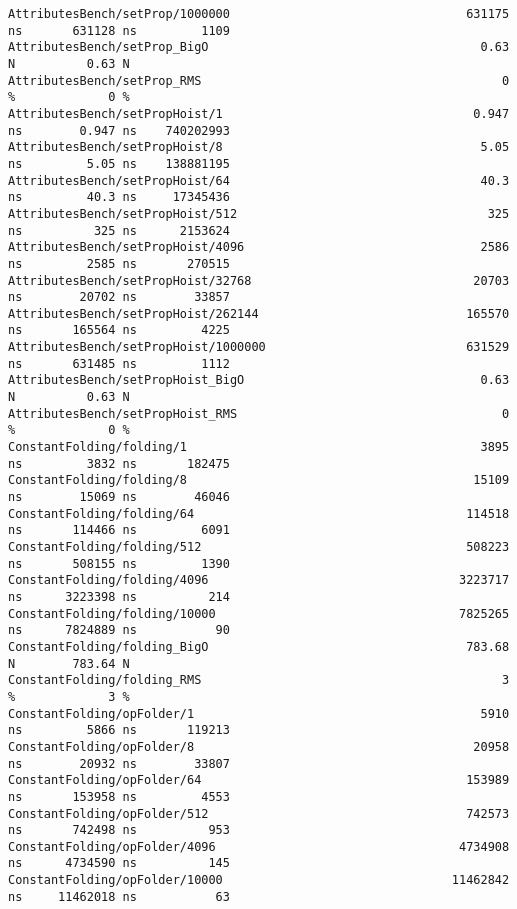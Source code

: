 \begin{code}
\begin{verbatim}
AttributesBench/setProp/1000000                                 631175 ns       631128 ns         1109
AttributesBench/setProp_BigO                                      0.63 N          0.63 N
AttributesBench/setProp_RMS                                          0 %             0 %
AttributesBench/setPropHoist/1                                   0.947 ns        0.947 ns    740202993
AttributesBench/setPropHoist/8                                    5.05 ns         5.05 ns    138881195
AttributesBench/setPropHoist/64                                   40.3 ns         40.3 ns     17345436
AttributesBench/setPropHoist/512                                   325 ns          325 ns      2153624
AttributesBench/setPropHoist/4096                                 2586 ns         2585 ns       270515
AttributesBench/setPropHoist/32768                               20703 ns        20702 ns        33857
AttributesBench/setPropHoist/262144                             165570 ns       165564 ns         4225
AttributesBench/setPropHoist/1000000                            631529 ns       631485 ns         1112
AttributesBench/setPropHoist_BigO                                 0.63 N          0.63 N
AttributesBench/setPropHoist_RMS                                     0 %             0 %
ConstantFolding/folding/1                                         3895 ns         3832 ns       182475
ConstantFolding/folding/8                                        15109 ns        15069 ns        46046
ConstantFolding/folding/64                                      114518 ns       114466 ns         6091
ConstantFolding/folding/512                                     508223 ns       508155 ns         1390
ConstantFolding/folding/4096                                   3223717 ns      3223398 ns          214
ConstantFolding/folding/10000                                  7825265 ns      7824889 ns           90
ConstantFolding/folding_BigO                                    783.68 N        783.64 N
ConstantFolding/folding_RMS                                          3 %             3 %
ConstantFolding/opFolder/1                                        5910 ns         5866 ns       119213
ConstantFolding/opFolder/8                                       20958 ns        20932 ns        33807
ConstantFolding/opFolder/64                                     153989 ns       153958 ns         4553
ConstantFolding/opFolder/512                                    742573 ns       742498 ns          953
ConstantFolding/opFolder/4096                                  4734908 ns      4734590 ns          145
ConstantFolding/opFolder/10000                                11462842 ns     11462018 ns           63

\end{verbatim}
\end{code}
